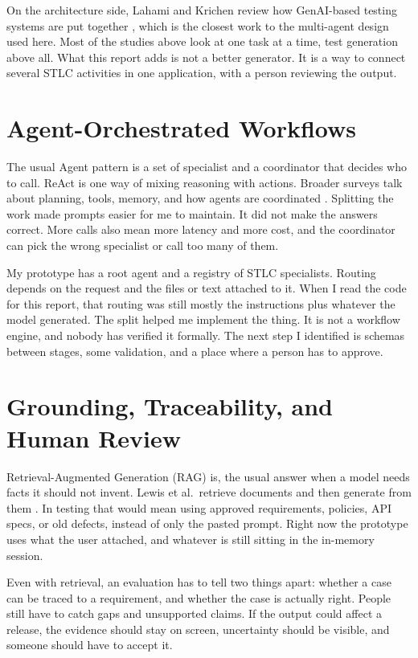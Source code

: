 On the architecture side, Lahami and Krichen review how GenAI-based testing systems are put together \cite{lahami2026genaitesting}, which is the closest work to the multi-agent design used here. Most of the studies above look at one task at a time, test generation above all. What this report adds is not a better generator. It is a way to connect several STLC activities in one application, with a person reviewing the output.

\section{Agent-Orchestrated Workflows}
The usual Agent pattern is a set of specialist and a coordinator that decides who to call. ReAct is one way of mixing reasoning with actions. Broader surveys talk about planning, tools, memory, and how agents are coordinated \cite{yao2023react,wang2023agents}. Splitting the work made prompts easier for me to maintain. It did not make the answers correct. More calls also mean more latency and more cost, and the coordinator can pick the wrong specialist or call too many of them.

My prototype has a root agent and a registry of STLC specialists. Routing depends on the request and the files or text attached to it. When I read the code for this report, that routing was still mostly the instructions plus whatever the model generated. The split helped me implement the thing. It is not a workflow engine, and nobody has verified it formally. The next step I identified is schemas between stages, some validation, and a place where a person has to approve.

\section{Grounding, Traceability, and Human Review}
Retrieval-Augmented Generation (RAG) is, the usual answer when a model needs facts it should not invent. Lewis et al.\ retrieve documents and then generate from them \cite{lewis2020rag}. In testing that would mean using approved requirements, policies, API specs, or old defects, instead of only the pasted prompt. Right now the prototype uses what the user attached, and whatever is still sitting in the in-memory session.

Even with retrieval, an evaluation has to tell two things apart: whether a case can be traced to a requirement, and whether the case is actually right. People still have to catch gaps and unsupported claims. If the output could affect a release, the evidence should stay on screen, uncertainty should be visible, and someone should have to accept it.

